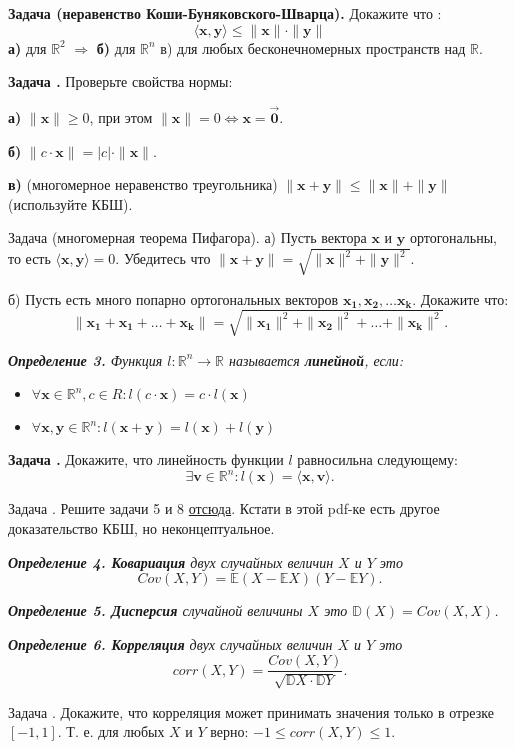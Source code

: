 \documentclass[12pt,a4paper]{article}
\def\R{\mathbb{R}}
\def\E{\mathbb{E}}
\def\D{\mathbb{D}}
\newcounter{znum}
\newcommand{\zz}[1]{\addtocounter{znum}{1} \textbf{Задача \arabic{znum}#1. }}
\newcommand{\z}[1]{\addtocounter{znum}{1} Задача \arabic{znum}#1. }
\begin{document}
\zz{ (неравенство Коши-Буняковского-Шварца)} Докажите что :
$$ \langle \mathbf{x}, \mathbf{y} \rangle  \leqslant \|\mathbf{x}\| \cdot \|\mathbf{y}\|$$
\textbf{а)} для $\R^2$ $\Rightarrow$
\textbf{б)} для $\R^n$
в) для любых бесконечномерных пространств над $\R$.

\zz{} Проверьте свойства нормы:\par
\textbf{а)} $\|\mathbf{x}\| \geqslant 0$, при этом $\|\mathbf{x}\| = 0 \Leftrightarrow \mathbf{x} = \overrightarrow{\mathbf{0}}$. \par
\textbf{б)} $\|c \cdot \mathbf{x}\| = |c| \cdot \|\mathbf{x}\|$. \par
\textbf{в)} (многомерное неравенство треугольника) $\|\mathbf{x} + \mathbf{y}\| \leqslant \|\mathbf{x}\| + \|\mathbf{y}\|$ (используйте КБШ).

\z{ (многомерная теорема Пифагора)} а) Пусть вектора $\mathbf{x}$ и $\mathbf{y}$ ортогональны, то есть $\langle \mathbf{x}, \mathbf{y} \rangle = 0$. Убедитесь что $\|\mathbf{x} + \mathbf{y}\| = \sqrt{\|\mathbf{x}\|^2 + \|\mathbf{y}\|^2}$.

б) Пусть есть много попарно ортогональных векторов $\mathbf{x_1}, \mathbf{x_2}, \ldots \mathbf{x_k}$. Докажите что: $$\|\mathbf{x_1} + \mathbf{x_1} + \ldots + \mathbf{x_k}\| = \sqrt{\|\mathbf{x_1}\|^2 + \|\mathbf{x_2}\|^2 + \ldots + \|\mathbf{x_k}\|^2}. $$

{\it \textbf{Определение 3.} Функция $l: \R^ n \to \R$ называется \textbf{линейной}, если:
\begin{itemize}
\item $\forall \mathbf{x} \in \R^n, c \in R : l(c \cdot \mathbf{x}) = c \cdot l(\mathbf{x})$
\item $\forall \mathbf{x}, \mathbf{y} \in \R^n : l(\mathbf{x} + \mathbf{y}) = l(\mathbf{x}) + l(\mathbf{y})$
\end{itemize}
}

\zz{} Докажите, что линейность функции $l$ равносильна следующему:
$$ \exists \mathbf{v} \in \R^n : l(\mathbf{x}) = \langle \mathbf{x}, \mathbf{v}\rangle.$$

\z{} Решите задачи 5 и 8 \href{https://zftsh.online/public/folder\_attachment/a0/a9/a8f7\_061b.pdf?c=006f}{отсюда}. Кстати в этой pdf-ке есть другое доказательство КБШ, но неконцептуальное.

{\it \textbf{Определение 4. Ковариация} двух случайных величин $X$ и $Y$ это
$$Cov(X, Y) = \E (X - \E X)(Y - \E Y).$$
}

{\it \textbf{Определение 5. Дисперсия} случайной величины $X$ это $\D (X) = Cov(X, X)$.}

{\it \textbf{Определение 6. Корреляция} двух случайных величин $X$ и $Y$ это
$$corr(X, Y) = \frac{Cov(X, Y)}{\sqrt{\D X \cdot \D Y}}.$$}

\z{} Докажите, что корреляция может принимать значения только в отрезке $[-1, 1]$. Т. е. для любых $X$ и $Y$ верно: $-1 \leqslant corr(X, Y) \leqslant 1$.
\end{document}
